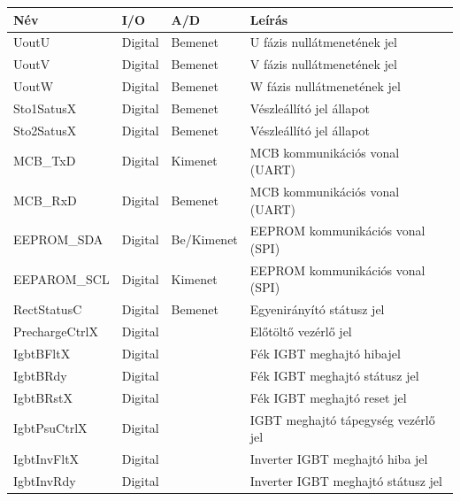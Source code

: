 \begin{table}[]
\centering
\begin{tabular}{|l|l|l|l|}
\hline
\textbf{Név}   & \textbf{I/O} & \textbf{A/D} & \textbf{Leírás}                 					\\ \hline
UoutU          & Digital      & Bemenet      & U fázis nullátmenetének jel 						\\ \hline
UoutV          & Digital      & Bemenet      & V fázis nullátmenetének jel  					\\ \hline
UoutW          & Digital      & Bemenet      & W fázis nullátmenetének jel  				    \\ \hline
Sto1SatusX     & Digital      & Bemenet      & Vészleállító jel állapot   				     	\\ \hline
Sto2SatusX     & Digital      & Bemenet      & Vészleállító jel állapot    						\\ \hline
MCB\_TxD       & Digital      & Kimenet      & MCB kommunikációs vonal (UART)    				\\ \hline
MCB\_RxD       & Digital      & Bemenet      & MCB kommunikációs vonal (UART)                   \\ \hline
EEPROM\_SDA    & Digital      & Be/Kimenet   & EEPROM kommunikációs vonal (SPI)                 \\ \hline
EEPAROM\_SCL   & Digital      & Kimenet      & EEPROM kommunikációs vonal (SPI)                 \\ \hline
RectStatusC    & Digital      & Bemenet      & Egyenirányító státusz jel                        \\ \hline
PrechargeCtrlX & Digital      &              & Előtöltő vezérlő jel                             \\ \hline
IgbtBFltX      & Digital      &              & Fék IGBT meghajtó hibajel                        \\ \hline
IgbtBRdy       & Digital      &              & Fék IGBT meghajtó státusz jel                    \\ \hline
IgbtBRstX      & Digital      &              & Fék IGBT meghajtó reset jel                      \\ \hline
IgbtPsuCtrlX   & Digital      &              & IGBT meghajtó tápegység vezérlő jel              \\ \hline
IgbtInvFltX    & Digital      &              & Inverter IGBT meghajtó hiba jel                  \\ \hline
IgbtInvRdy     & Digital      &              & Inverter IGBT meghajtó státusz jel               \\ \hline

\end{tabular}
\end{table}
